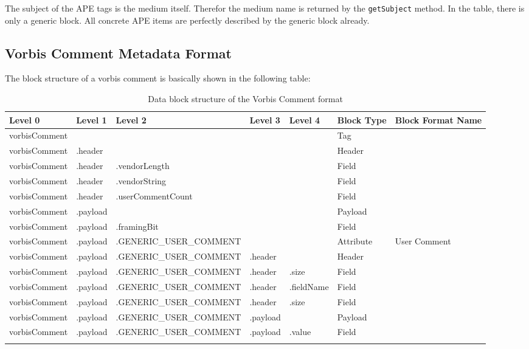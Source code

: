 
The subject of the APE tags is the medium itself. Therefor the medium name is returned by the \texttt{getSubject} method. In the table, there is only a generic block. All concrete APE items are perfectly described by the generic block already.


\subsection{Vorbis Comment Metadata Format}
\label{sec:VorbisComment}

The block structure of a vorbis comment is basically shown in the following table:

\begin{longtable}{|p{}|p{}|p{}|p{}|p{}|p{}|p{}|}
	\hline
	Level 0 & Level 1 & Level 2 & Level 3 & Level 4 & Block Type & Block Format Name\\
	\endhead
	\hline
 	vorbisComment & & & & & Tag & \\
	\hline
 	vorbisComment & .header & & & & Header & \\
	\hline
 	vorbisComment & .header & .vendorLength & & & Field & \\
	\hline
 	vorbisComment & .header & .vendorString & & & Field & \\
	\hline
 	vorbisComment & .header & .userCommentCount & & & Field & \\
	\hline
 	vorbisComment & .payload & & & & Payload & \\
	\hline
 	vorbisComment & .payload & .framingBit & & & Field & \\
	\hline
 	vorbisComment & .payload & .GENERIC_USER_COMMENT & & & Attribute & User Comment \\
	\hline
 	vorbisComment & .payload & .GENERIC_USER_COMMENT & .header & & Header & \\
	\hline
 	vorbisComment & .payload & .GENERIC_USER_COMMENT & .header & .size & Field & \\
	\hline
 	vorbisComment & .payload & .GENERIC_USER_COMMENT & .header & .fieldName & Field & \\
	\hline
 	vorbisComment & .payload & .GENERIC_USER_COMMENT & .header & .size & Field & \\
	\hline
 	vorbisComment & .payload & .GENERIC_USER_COMMENT & .payload & & Payload & \\
	\hline
 	vorbisComment & .payload & .GENERIC_USER_COMMENT & .payload & .value & Field & \\
	\hline
	\caption{Data block structure of the Vorbis Comment format}
	\label{tab:DatablockstructureoftheVorbisCommentformats}
\end{longtable}

